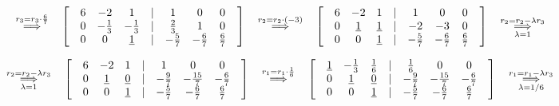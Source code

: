 \documentclass[fleqn]{article}
\begin{document}
\[
\hspace{0.321cm} \overset{r_3 = r_3 \cdot \frac{6}{7}}{\underset{}{\implies}} \hspace{0.321cm}
\begin{bmatrix}
& 6 & -2 & 1 & | & 1 & 0 & 0 & \\
& 0 & -\frac{1}{3} & -\frac{1}{3} & | & \frac{2}{3} & 1 & 0 & \\
& 0 & 0 & \underline{1} & | & -\frac{5}{7} & -\frac{6}{7} & \frac{6}{7} & 
\end{bmatrix}
\hspace{0.321cm} \overset{r_2=r_2 \cdot (-3)}{\underset{}{\implies}} \hspace{0.321cm}
\begin{bmatrix}
& 6 & -2 & 1 & | & 1 & 0 & 0 & \\
& 0 & \underline{1} & \underline{1} & | & -2 & -3 & 0 & \\
& 0 & 0 & \underline{1} & | & -\frac{5}{7} & -\frac{6}{7} & \frac{6}{7} & 
\end{bmatrix}
\hspace{0.321cm} \overset{r_2=r_2-\lambda r_3}{\underset{\lambda=1}{\implies}} \hspace{0.321cm}
\]

\[
\hspace{0.321cm} \overset{r_2=r_2-\lambda r_3}{\underset{\lambda=1}{\implies}} \hspace{0.321cm}
\begin{bmatrix}
& 6 & -2 & 1 & | & 1 & 0 & 0 & \\
& 0 & \underline{1} & \underline{0} & | & -\frac{9}{7} & -\frac{15}{7} & -\frac{6}{7} & \\
& 0 & 0 & \underline{1} & | & -\frac{5}{7} & -\frac{6}{7} & \frac{6}{7} & 
\end{bmatrix}
\hspace{0.321cm} \overset{r_1=r_1 \cdot \frac{1}{6}}{\underset{}{\implies}} \hspace{0.321cm}
\begin{bmatrix}
& \underline{1} & -\frac{1}{3} & \frac{1}{6} & | & \frac{1}{6} & 0 & 0 & \\
& 0 & \underline{1} & \underline{0} & | & -\frac{9}{7} & -\frac{15}{7} & -\frac{6}{7} & \\
& 0 & 0 & \underline{1} & | & -\frac{5}{7} & -\frac{6}{7} & \frac{6}{7} & 
\end{bmatrix}
\hspace{0.321cm} \overset{r_1=r_1-\lambda r_3}{\underset{\lambda=1/6}{\implies}} \hspace{0.321cm}
\]
\end{document}

